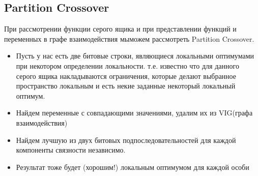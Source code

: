 \subsection{Partition Crossover}
При рассмотрении функции серого ящика и при представлении функций и переменных в графе взаимодействия мыможем рассмотреть Partition Crossover.\\
\begin{itemize}
    \item Пусть у нас есть две битовые строки, являющиеся локальными оптимумами при некотором определении локальности. т.е. известно что для данного серого ящика накладываются ограничения, которые делают выбранное пространство локальным и есть некие заданные некоторый локальный оптимум.
    \item Найдем переменные с совпадающими значениями, удалим их из VIG(графа взаимодействия)
    \item Найдем лучшую из двух битовых подпоследовательностей для каждой компоненты связности независимо.
    \item Результат тоже будет (хорошим!) локальным оптимумом для каждой особи
\end{itemize}

